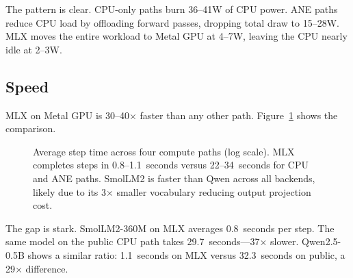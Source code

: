 \documentclass[11pt]{article}
\begin{document}
The pattern is clear.  CPU-only paths burn 36--41W of CPU power.  ANE paths reduce CPU load by offloading forward passes, dropping total draw to 15--28W.  MLX moves the entire workload to Metal GPU at 4--7W, leaving the CPU nearly idle at 2--3W.

\subsection{Speed}
\label{sec:speed}

MLX on Metal GPU is 30--40$\times$ faster than any other path.  Figure~\ref{fig:speed} shows the comparison.

\begin{figure}[t]
\centering
{}
\caption{Average step time across four compute paths (log scale).  MLX completes steps in 0.8--1.1~seconds versus 22--34~seconds for CPU and ANE paths.  SmolLM2 is faster than Qwen across all backends, likely due to its 3$\times$ smaller vocabulary reducing output projection cost.}
\label{fig:speed}
\end{figure}

The gap is stark.  SmolLM2-360M on MLX averages 0.8~seconds per step.  The same model on the public CPU path takes 29.7~seconds---37$\times$ slower.  Qwen2.5-0.5B shows a similar ratio: 1.1~seconds on MLX versus 32.3~seconds on public, a 29$\times$ difference.
\end{document}
